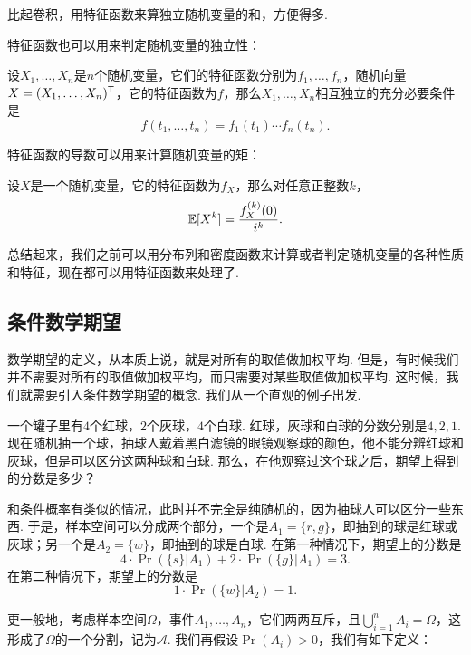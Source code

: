 比起卷积，用特征函数来算独立随机变量的和，方便得多. 

特征函数也可以用来判定随机变量的独立性：

\begin{theorem}\label{thm:characteristic-function-independence}
设$X_1,\dots,X_n$是$n$个随机变量，它们的特征函数分别为$f_1,\dots,f_n$，随机向量$X=(X_1,\dots,X_n)^{\mathsf{T}}$，它的特征函数为$f$，那么$X_1,\dots,X_n$相互独立的充分必要条件是
\[f(t_1,\dots,t_n)=f_1(t_1)\cdots f_n(t_n).\]
\end{theorem}

特征函数的导数可以用来计算随机变量的矩：

\begin{theorem}\label{thm:characteristic-function-moment}
设$X$是一个随机变量，它的特征函数为$f_X$，那么对任意正整数$k$，
\[\mathbb{E}[X^k]=\frac{f_X^{(k)}(0)}{i^k}.\]
\end{theorem}

总结起来，我们之前可以用分布列和密度函数来计算或者判定随机变量的各种性质和特征，现在都可以用特征函数来处理了. 

\subsection{条件数学期望}\label{subsec:conditional-expectation}

数学期望的定义，从本质上说，就是对所有的取值做加权平均. 但是，有时候我们并不需要对所有的取值做加权平均，而只需要对某些取值做加权平均. 这时候，我们就需要引入条件数学期望的概念. 我们从一个直观的例子出发. 

\begin{example}
一个罐子里有$4$个红球，$2$个灰球，$4$个白球. 红球，灰球和白球的分数分别是$4,2,1$. 现在随机抽一个球，抽球人戴着黑白滤镜的眼镜观察球的颜色，他不能分辨红球和灰球，但是可以区分这两种球和白球. 那么，在他观察过这个球之后，期望上得到的分数是多少？

和条件概率有类似的情况，此时并不完全是纯随机的，因为抽球人可以区分一些东西. 于是，样本空间可以分成两个部分，一个是$A_1=\{r,g\}$，即抽到的球是红球或灰球；另一个是$A_2=\{w\}$，即抽到的球是白球. 在第一种情况下，期望上的分数是
\[4\cdot\Pr(\{s\}|A_1)+2\cdot\Pr(\{g\}|A_1)=3.\]
在第二种情况下，期望上的分数是
\[1\cdot\Pr(\{w\}|A_2)=1.\]
\end{example}

更一般地，考虑样本空间$\Omega$，事件$A_1,\dots,A_n$，它们两两互斥，且$\bigcup_{i=1}^n A_i=\Omega$，这形成了$\Omega$的一个分割，记为$\mathscr{A}$. 我们再假设$\Pr(A_i)>0$，我们有如下定义：

